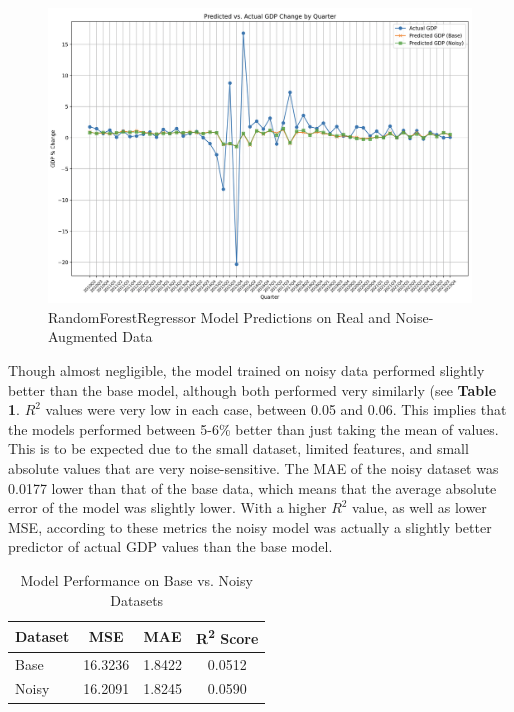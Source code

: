 \documentclass[10pt,twocolumn]{article}
\begin{document}
\begin{figure}[h]
    \centering
    \includegraphics[width=\columnwidth]{pred_vs_actual_gdp.png}
    \caption{RandomForestRegressor Model Predictions on Real and Noise-Augmented Data}
    \label{fig:pred_vs_actual_gdp}
\end{figure}

Though almost negligible, the model trained on noisy data performed slightly better than the base model, although both performed very similarly (see \textbf{Table 1}. $R^2$ values were very low in each case, between 0.05 and 0.06. This implies that the models performed between 5-6\% better than just taking the mean of values. This is to be expected due to the small dataset, limited features, and small absolute values that are very noise-sensitive. The MAE of the noisy dataset was 0.0177 lower than that of the base data, which means that the average absolute error of the model was slightly lower. With a higher $R^2$ value, as well as lower MSE, according to these metrics the noisy model was actually a slightly better predictor of actual GDP values than the base model.\\

\begin{table}[h]
\centering
\caption{Model Performance on Base vs. Noisy Datasets}
\begin{tabular}{|l|c|c|c|}
\hline
\textbf{Dataset} & \textbf{MSE} & \textbf{MAE} & \textbf{R\textsuperscript{2} Score} \\
\hline
Base  & 16.3236 & 1.8422 & 0.0512 \\
Noisy & 16.2091 & 1.8245 & 0.0590 \\
\hline
\end{tabular}
\end{table}
\end{document}
